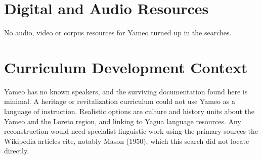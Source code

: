 \documentclass[12pt]{article}
\begin{document}
\section{Digital and Audio Resources}
No audio, video or corpus resources for Yameo turned up in the searches.

\section{Curriculum Development Context}
Yameo has no known speakers, and the surviving documentation found here is minimal. A heritage or revitalization curriculum could not use Yameo as a language of instruction. Realistic options are culture and history units about the Yameo and the Loreto region, and linking to Yagua language resources. Any reconstruction would need specialist linguistic work using the primary sources the Wikipedia articles cite, notably Mason (1950), which this search did not locate directly.
\end{document}
